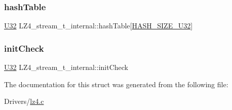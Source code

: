 \mbox{\label{struct_l_z4__stream__t__internal_a81762be862caad87455554f2d39d4a29}} 
\subsubsection{\texorpdfstring{hash\+Table}{hashTable}}
{\footnotesize\ttfamily \mbox{\hyperlink{lz4_8c_ac3df7cf3c8cb172a588adec881447d68}{U32}} L\+Z4\+\_\+stream\+\_\+t\+\_\+internal\+::hash\+Table\mbox{[}\mbox{\hyperlink{lz4_8c_a10355a0f2e4e7f206a362ffa2272ec22}{H\+A\+S\+H\+\_\+\+S\+I\+Z\+E\+\_\+\+U32}}\mbox{]}}

\mbox{\label{struct_l_z4__stream__t__internal_a210c641599a4633cbf4e590cbc7a0a58}} 
\subsubsection{\texorpdfstring{init\+Check}{initCheck}}
{\footnotesize\ttfamily \mbox{\hyperlink{lz4_8c_ac3df7cf3c8cb172a588adec881447d68}{U32}} L\+Z4\+\_\+stream\+\_\+t\+\_\+internal\+::init\+Check}



The documentation for this struct was generated from the following file\+:\begin{DoxyCompactItemize}
\item 
Drivers/\mbox{\hyperlink{lz4_8c}{lz4.\+c}}\end{DoxyCompactItemize}
